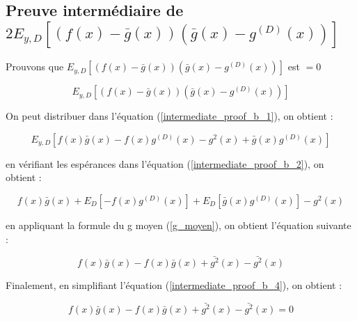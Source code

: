 \documentclass[a4paper]{article}
\begin{document}
\begin{appendices}
	\section{Preuve intermédiaire de $2E_{y,D} [(f(x)-\bar{g}(x)) (\bar{g}(x) - g^{(D)}(x)) ]$}
	\label{intermediate_proof_b_subsection}
	Prouvons que $E_{y,D} [(f(x)-\bar{g}(x)) (\bar{g}(x) - g^{(D)}(x)) ]$ est $= 0$ 
	
	\begin{equation}
		\label{intermediate_proof_b_1}
		E_{y,D} [(f(x)-\bar{g}(x)) (\bar{g}(x) - g^{(D)}(x)) ]
	\end{equation}
	
	On peut distribuer dans l'équation (\ref{intermediate_proof_b_1}), on obtient :
	
	\begin{equation}
		\label{intermediate_proof_b_2}
		E_{y,D} [ f(x)\bar{g}(x) - f(x)g^{(D)}(x) -g^2(x) + \bar{g}(x)g^{(D)}(x)]
	\end{equation}
	
	en vérifiant les espérances dans l'équation (\ref{intermediate_proof_b_2}), on obtient :
	
	\begin{equation}
		\label{intermediate_proof_b_3}
		f(x)\bar{g}(x) + E_{D} [- f(x)g^{(D)}(x)] + E_{D} [ \bar{g}(x)g^{(D)}(x)] -g^2(x)
	\end{equation}
	
	en appliquant la formule du g moyen (\ref{g_moyen}), on obtient l'équation suivante :
	
	\begin{equation}
		\label{intermediate_proof_b_4}
		f(x)\bar{g}(x) - f(x)\bar{g}(x) + \bar{g^2}(x) -\bar{g^2}(x)
	\end{equation}
	
	Finalement, en simplifiant l'équation (\ref{intermediate_proof_b_4}), on obtient :
	
	\begin{equation}
		\label{intermediate_proof_b_5}
		f(x)\bar{g}(x) - f(x)\bar{g}(x) + \bar{g^2}(x) -\bar{g^2}(x) = 0
	\end{equation}
\end{appendices}

\newpage
\end{document}
